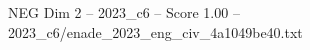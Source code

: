 \begin{textsample}{NEG Dim 2 – 2023\_c6 – Score 1.00 – 2023\_c6/enade\_2023\_eng\_civ\_4a1049be40.txt}
\end{textsample}
